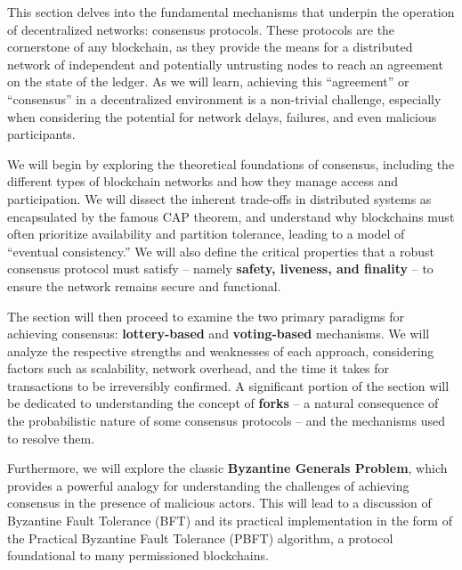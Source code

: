 
This section delves into the fundamental mechanisms that underpin the
operation of decentralized networks: consensus protocols. These
protocols are the cornerstone of any blockchain, as they provide the
means for a distributed network of independent and potentially
untrusting nodes to reach an agreement on the state of the ledger. As we
will learn, achieving this ``agreement'' or ``consensus'' in a
decentralized environment is a non-trivial challenge, especially when
considering the potential for network delays, failures, and even
malicious participants.

We will begin by exploring the theoretical foundations of consensus,
including the different types of blockchain networks and how they manage
access and participation. We will dissect the inherent trade-offs in
distributed systems as encapsulated by the famous CAP theorem, and
understand why blockchains must often prioritize availability and
partition tolerance, leading to a model of ``eventual consistency.'' We
will also define the critical properties that a robust consensus
protocol must satisfy -- namely \textbf{safety, liveness, and finality} -- to
ensure the network remains secure and functional.

The section will then proceed to examine the two primary paradigms for
achieving consensus: \textbf{lottery-based} and \textbf{voting-based} mechanisms. We will
analyze the respective strengths and weaknesses of each approach,
considering factors such as scalability, network overhead, and the time
it takes for transactions to be irreversibly confirmed. A significant
portion of the section will be dedicated to understanding the concept of
\textbf{forks} -- a natural consequence of the probabilistic nature of some
consensus protocols -- and the mechanisms used to resolve them.

Furthermore, we will explore the classic \textbf{Byzantine Generals Problem},
which provides a powerful analogy for understanding the challenges of
achieving consensus in the presence of malicious actors. This will lead
to a discussion of Byzantine Fault Tolerance (BFT) and its practical
implementation in the form of the Practical Byzantine Fault Tolerance
(PBFT) algorithm, a protocol foundational to many permissioned
blockchains.

